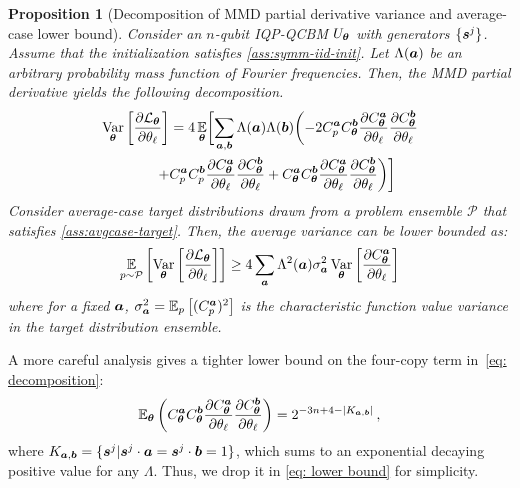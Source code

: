 \documentclass{article}
\theoremstyle{plain}
\newtheorem{proposition}[theorem]{Proposition}
\theoremstyle{definition}
\theoremstyle{remark}
\begin{document}
\begin{proposition}[Decomposition of MMD partial derivative variance and average-case lower bound]
\label{prop:lower}
Consider an $n$-qubit IQP-QCBM $U_{\bm{\theta}}$ with generators $\{{\bm{s}^j}\}$. Assume that the initialization satisfies \cref{ass:symm-iid-init}. Let $\Lambda({\bm{a}})$ be an arbitrary probability mass function of Fourier frequencies. Then, the MMD partial derivative yields the following decomposition.
\begin{align}
\operatorname*{Var}_{{\bm{\theta}}} \left[ \frac{\partial \mathcal{L}_{\bm{\theta}}}{\partial \theta_\ell} \right]& = 4 \operatorname*{\mathbb{E}}_{{\bm{\theta}}} \biggl[ \sum_{{\bm{a}}, {\bm{b}}} \Lambda({\bm{a}}) \Lambda({\bm{b}}) \biggl( \nonumber - 2C^{\bm{a}}_p C_{\bm{\theta}}^{\bm{b}} \frac{\partial C_{\bm{\theta}}^{\bm{a}}}{\partial \theta_\ell} \frac{\partial C_{\bm{\theta}}^{\bm{b}}}{\partial \theta_\ell} \\ +&  
 C^{\bm{a}}_p C^{\bm{b}}_p \frac{\partial C_{\bm{\theta}}^{\bm{a}}}{\partial \theta_\ell} \frac{\partial C_{\bm{\theta}}^{\bm{b}}}{\partial \theta_\ell} + C_{\bm{\theta}}^{\bm{a}} C_{\bm{\theta}}^{\bm{b}} \frac{\partial C_{\bm{\theta}}^{\bm{a}}}{\partial \theta_\ell} \frac{\partial C_{\bm{\theta}}^{\bm{b}}}{\partial \theta_\ell} \biggr) \biggr]
 \label{eq: decomposition}
\end{align}
Consider average-case target distributions drawn from a problem ensemble $\mathcal{P}$ that satisfies \cref{ass:avgcase-target}. Then, the average variance can be lower bounded as:
\begin{equation}
\operatorname*{\mathbb{E}}_{p\sim\mathcal{P}} \left[\operatorname*{Var}_{{\bm{\theta}}} \left[ \frac{\partial \mathcal{L}_{\bm{\theta}}}{\partial \theta_\ell} \right]\right] \geq
4 \sum_{\bm{a}} \Lambda^2({\bm{a}})\sigma_{\bm{a}}^2\operatorname*{Var}_{{\bm{\theta}}} \left[ \frac{\partial C^{\bm{a}}_{\bm{\theta}}}{\partial \theta_\ell} \right]
\label{eq: lower bound}
\end{equation}
where for a fixed ${\bm{a}}$, $\sigma_{\bm{a}}^2 =\operatorname*{\mathbb {E}}_{p}\left[(C_p^{{\bm{a}}})^2\right]$ is the characteristic function value variance in the target distribution ensemble.
\end{proposition}
A more careful analysis gives a tighter lower bound on the four-copy term in~\cref{eq: decomposition}:
$$
\operatorname*{\mathbb{E}_{\bm{\theta}}}\left(C_{\bm{\theta}}^{\bm{a}} C_{\bm{\theta}}^{\bm{b}} \frac{\partial C_{\bm{\theta}}^{\bm{a}}}{\partial \theta_\ell} \frac{\partial C_{\bm{\theta}}^{\bm{b}}}{\partial \theta_\ell}\right)=2^{-3n+4-\abs{K_{{\bm{a}},{\bm{b}}}}}\,,
$$
where $K_{{\bm{a}},{\bm{b}}} = \{{\bm{s}^j}| {\bm{s}^j}\cdot{\bm{a}}={\bm{s}^j}\cdot{\bm{b}}=1\}$, which sums to an exponential decaying positive value for any $\Lambda$. Thus, we drop it in \cref{eq: lower bound} for simplicity.
\end{document}
